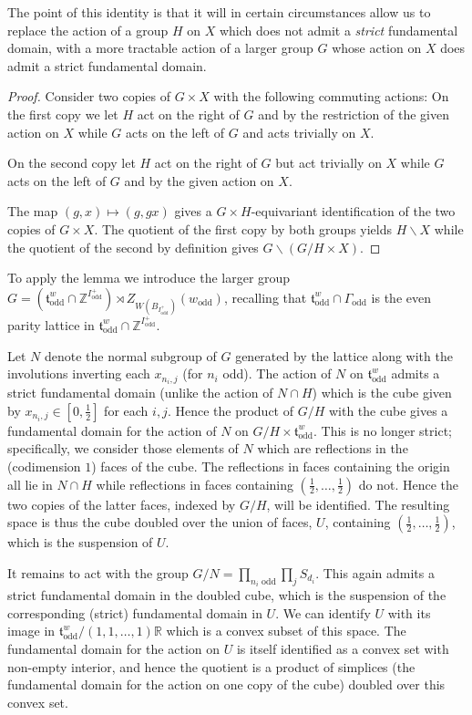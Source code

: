 \documentclass[11pt,a4paper]{article}
\def\t{\mathfrak t}
\def\R{\mathbb{R}}
\def\Z{\mathbb{Z}}
\def\odd{\mathrm{odd}}
\begin{document}
The point of this identity is that it will in certain circumstances allow us to replace the action of a group $H$ on $X$ which does not admit a \emph{strict} fundamental domain, with a more tractable action of a larger group $G$ whose action on $X$ does admit a strict fundamental domain.


\begin{proof}
    Consider two copies of $G\times X$ with the following commuting actions: On the first copy we let $H$ act on the right of $G$ and by the restriction of the given action on $X$ while $G$ acts on the left of $G$ and acts trivially on $X$.

    On the second copy let $H$ act on the right of $G$ but act trivially on $X$ while $G$ acts on the left of $G$ and by the given action on $X$.

    The map $(g,x)\mapsto (g,gx)$ gives a $G\times H$-equivariant identification of the two copies of $G\times X$. The quotient of the first copy by both groups yields $H\backslash X$ while the quotient of the second by definition gives $G\backslash(G/H\times X)$.
\end{proof}



To apply the lemma we introduce the larger group $G=(\t_\odd^w\cap \Z^{I^+_\odd})\rtimes Z_{W(B_{I^+_\odd})}(w_\odd)$, recalling that $\t_\odd^w\cap \Gamma_\odd$ is the even parity lattice in $\t_\odd^w\cap \Z^{I^+_\odd}$.

Let $N$ denote the normal subgroup of $G$ generated by the lattice along with the involutions inverting each $x_{n_i,j}$ (for $n_i$ odd). The action of $N$ on $\t_\odd^w$ admits a strict fundamental domain (unlike the action of $N\cap H$) which is the cube given by $x_{n_i,j}\in [0,\frac 12]$ for each $i,j$. Hence the product of $G/H$ with the cube gives a fundamental domain for the action of $N$ on $G/H\times \t_\odd^w$.  This is no longer strict; specifically, we consider those elements of $N$ which are reflections in the (codimension $1$) faces of the cube.  The reflections in faces containing the origin all lie in $N\cap H$ while reflections in faces containing $(\frac 12,\dots,\frac 12)$ do not.  Hence the two copies of the latter faces, indexed by $G/H$, will be identified. The resulting space is thus the cube doubled over the union of faces, $U$, containing $(\frac 12,\dots,\frac12)$, which is the suspension of $U$.

It remains to act with the group $G/N=\prod\limits_{n_i\text{ odd}}\prod_j S_{d_i}$. This again admits a strict fundamental domain in the doubled cube, which is the suspension of the corresponding (strict) fundamental domain in $U$.  We can identify $U$ with its image in $\t^w_\odd/(1,1,\dots,1)\R$ which is a convex subset of this space.  The fundamental domain for the action on $U$ is itself identified as a convex set with non-empty interior, and hence the quotient is a product of simplices (the fundamental domain for the action on one copy of the cube) doubled over this convex set.
\end{document}
